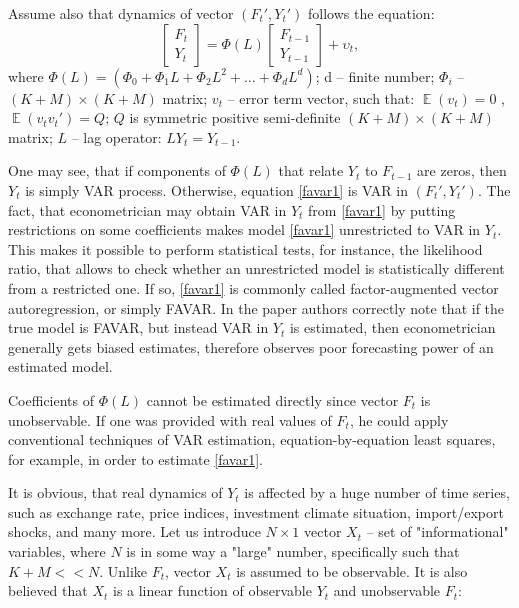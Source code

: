 \documentclass[a4paper, 14pt]{article}
\DeclareMathOperator*{\E}{\mathbb{E}}
\begin{document}
Assume also that dynamics of vector $(F_t', Y_t')$ follows the equation:
\begin{equation}\label{favar1}
	\begin{bmatrix}
	F_t \\
	Y_t
	\end{bmatrix} = \Phi (L) 
	\begin{bmatrix}
	F_{t-1} \\
	Y_{t-1}
	\end{bmatrix} + \upsilon_t ,
\end{equation}
where $\Phi (L) = (\Phi_0 + \Phi_1 L + \Phi_2 L^2 + \dotso + \Phi_d L^d)$;  d -- finite number; $\Phi_i$ -- $(K+M) \times (K+M)$ matrix; $v_t$ -- error term vector, such that: $\E(v_t) = 0$ , $\E(v_t v_t') = Q$; $Q$ is symmetric positive semi-definite $(K+M) \times (K+M)$ matrix; $L$ -- lag operator: $L Y_t = Y_{t-1}$.

One may see, that if components of $\Phi(L)$ that relate $Y_t$ to $F_{t-1}$ are zeros, then $Y_t$ is simply VAR process. Otherwise, equation \eqref{favar1} is VAR in $(F_t', Y_t')$. The fact, that econometrician may obtain VAR in $Y_t$ from \eqref{favar1} by putting restrictions on some coefficients makes model \eqref{favar1} unrestricted to VAR in $Y_t$. This makes it possible to perform statistical tests, for instance, the likelihood ratio, that allows to check whether an unrestricted model is statistically different from a restricted one. If so, \eqref{favar1} is commonly called factor-augmented vector autoregression, or simply FAVAR. In the paper \cite{bernanke2005measuring} authors correctly note that if the true model is FAVAR, but instead VAR in $Y_t$ is estimated, then econometrician generally gets biased estimates, therefore observes poor forecasting power of an estimated model.

Coefficients of $\Phi(L)$ cannot be estimated directly since vector $F_t$ is unobservable. If one was provided with real values of $F_t$, he could apply conventional techniques of VAR estimation, equation-by-equation least squares, for example, in order to estimate \eqref{favar1}. 

It is obvious, that real dynamics of $Y_t$ is affected by a huge number of time series, such as exchange rate, price indices, investment climate situation, import/export shocks, and many more. Let us introduce $N\times 1$ vector $X_t$ -- set of "informational" variables, where $N$ is in some way a "large" number, specifically such that $K+M << N$. Unlike $F_t$, vector $X_t$ is assumed to be observable. It is also believed that $X_t$ is a linear function of observable $Y_t$ and unobservable $F_t$:
\end{document}
